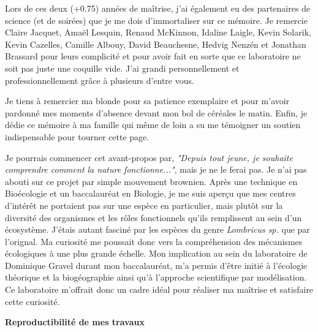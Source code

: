 
Lors de ces deux (+0.75) années de maîtrise, j'ai également eu des partenaires de science (et de
soirées) que je me dois d'immortaliser sur ce mémoire. Je remercie Claire Jacquet, Amaël Lesquin,
Renaud McKinnon, Idaline Laigle, Kevin Solarik, Kevin Cazelles, Camille Albouy, David Beauchesne,
Hedvig Nenzén et Jonathan Brassard pour leurs complicité et pour avoir fait en sorte que ce
laboratoire ne soit pas juste une coquille vide. J'ai grandi personnellement et professionnellement
grâce à plusieurs d'entre vous.

Je tiens à remercier ma blonde pour sa patience exemplaire et pour m'avoir pardonné mes moments
d'absence devant mon bol de céréales le matin. Enfin, je dédie ce mémoire à ma famille qui même de
loin a su me témoigner un soutien indispensable pour tourner cette page.


\avantpropos


Je pourrais commencer cet avant-propos par, \textit{"Depuis tout jeune, je souhaite comprendre
comment la nature fonctionne..."}, mais je ne le ferai pas. Je n'ai pas abouti sur ce projet par
simple mouvement brownien. Après une technique en Bioécologie et un baccalauréat en Biologie, je me
suis aperçu que mes centres d'intérêt ne portaient pas sur une espèce en particulier, mais plutôt
sur la diversité des organismes et les rôles fonctionnels qu'ils remplissent au sein d'un
écosystème. J'étais autant fasciné par les espèces du genre \textit{Lombricus sp.} que par
l'orignal. Ma curiosité me poussait donc vers la compréhension des mécanismes écologiques à une plus
grande échelle. Mon implication au sein du laboratoire de Dominique Gravel durant mon baccalauréat,
m'a permis d'être initié à l'écologie théorique et la biogéographie ainsi qu'à l'approche
scientifique par modélisation. Ce laboratoire m'offrait donc un cadre idéal pour réaliser ma
maîtrise et satisfaire cette curiosité.

\noindent\textbf{Reproductibilité de mes travaux}

